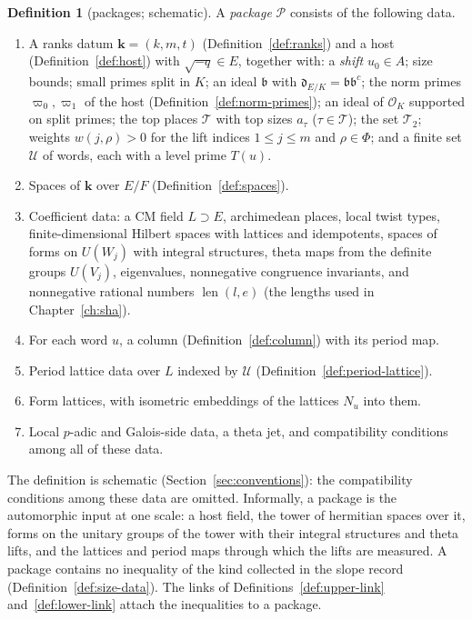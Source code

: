 \documentclass[11pt]{amsbook}
\theoremstyle{plain}
\theoremstyle{definition}
\newtheorem{definition}[theorem]{Definition}
\theoremstyle{remark}
\numberwithin{equation}{section}
\numberwithin{figure}{chapter}
\numberwithin{table}{chapter}
\newcommand{\Top}{\mathcal{T}}
\newcommand{\Words}{\mathcal{U}}
\newcommand{\shalen}{\operatorname{len}}
\begin{document}
\begin{definition}[packages; schematic]\label{def:package}
A \emph{package} $\mathcal P$ consists of the following data.
\begin{enumerate}[label=(\arabic*)]
\item A ranks datum $\mathbf k=(k,m,t)$
(Definition~\ref{def:ranks}) and a host
(Definition~\ref{def:host}) with $\sqrt{-q}\in E$, together with:
a \emph{shift} $u_0\in A$; size bounds; small primes split in $K$; an ideal
$\mathfrak b$ with
$\mathfrak d_{E/K}=\mathfrak b\mathfrak b^c$; the norm primes
$\varpi_0,\varpi_1$ of the host (Definition~\ref{def:norm-primes});
an ideal of $\mathcal O_K$ supported
on split primes; the top places $\Top$ with top sizes $a_\tau$
($\tau\in\Top$); the set $\Top_2$; weights $w(j,\rho)>0$ for the lift
indices $1\le j\le m$ and $\rho\in\Phi$; and a finite set $\Words$ of
words, each with a level prime $T(u)$.
\item Spaces of $\mathbf k$ over $E/F$ (Definition~\ref{def:spaces}).
\item Coefficient data: a CM field $L\supset E$, archimedean places,
local twist types, finite-dimensional Hilbert spaces with lattices and
idempotents, spaces of forms on $U(W_j)$ with integral structures,
theta maps from the definite groups $U(V_j)$, eigenvalues, nonnegative
congruence invariants, and nonnegative rational numbers
$\shalen(l,e)$ (the lengths used in Chapter~\ref{ch:sha}).
\item For each word $u$, a column (Definition~\ref{def:column}) with
its period map.
\item Period lattice data over $L$ indexed by $\Words$
(Definition~\ref{def:period-lattice}).
\item Form lattices, with isometric embeddings of the lattices $N_u$
into them.
\item Local $p$-adic and Galois-side data, a theta jet, and
compatibility conditions among all of these data.
\end{enumerate}
\end{definition}

\noindent The definition is schematic (Section~\ref{sec:conventions}):
the compatibility conditions among these data are omitted. Informally,
a package is the automorphic input at one scale: a host field, the
tower of hermitian spaces over it, forms on the unitary groups of the
tower with their integral structures and theta lifts, and the lattices
and period maps through which the lifts are measured. A package
contains no inequality of the kind collected in
the slope record (Definition~\ref{def:size-data}). The links of
Definitions~\ref{def:upper-link} and~\ref{def:lower-link} attach the
inequalities to a package.
\end{document}
